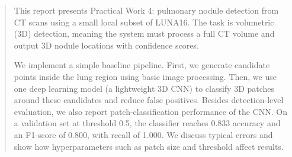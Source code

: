\begin{abstract}
This report presents Practical Work 4: pulmonary nodule detection from CT scans using a small local subset of LUNA16. The task is volumetric (3D) detection, meaning the system must process a full CT volume and output 3D nodule locations with confidence scores.

We implement a simple baseline pipeline. First, we generate candidate points inside the lung region using basic image processing. Then, we use one deep learning model (a lightweight 3D CNN) to classify 3D patches around these candidates and reduce false positives. Besides detection-level evaluation, we also report patch-classification performance of the CNN. On a validation set at threshold 0.5, the classifier reaches 0.833 accuracy and an F1-score of 0.800, with recall of 1.000. We discuss typical errors and show how hyperparameters such as patch size and threshold affect results.
\end{abstract}